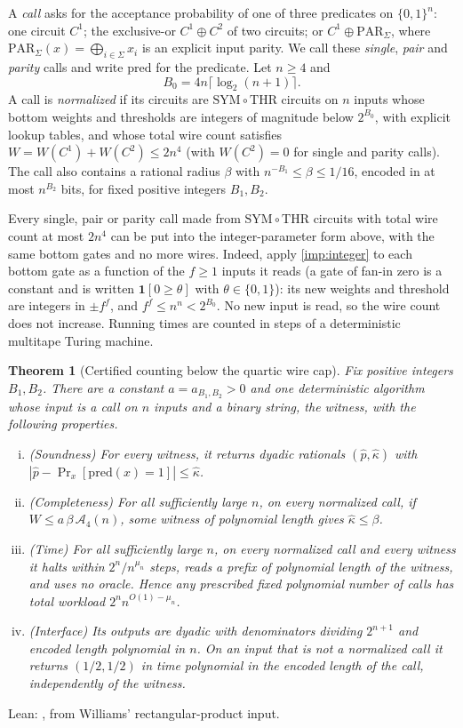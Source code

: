 \documentclass[11pt,letterpaper]{article}
\newtheorem{theorem}{Theorem}[section]
\theoremstyle{definition}
\theoremstyle{remark}
\newcommand{\THR}{\mathrm{THR}}
\newcommand{\SYM}{\mathrm{SYM}}
\newcommand{\PAR}{\mathrm{PAR}}
\newcommand{\pred}{\mathrm{pred}}
\newcommand{\ind}{\mathbf 1}
\newcommand{\lgx}{\log_2}
\newcommand{\phat}{\widehat p}
\newcommand{\khat}{\widehat\kappa}
\begin{document}
A \emph{call} asks for the acceptance
probability of one of three predicates on \(\{0,1\}^n\): one circuit
\(C^1\); the exclusive-or \(C^1\oplus C^2\) of two circuits; or
\(C^1\oplus\PAR_\Sigma\), where \(\PAR_\Sigma(x)=\bigoplus_{i\in\Sigma}x_i\)
is an explicit input parity. We call these \emph{single},
\emph{pair} and \emph{parity} calls and write \(\pred\) for the
predicate. Let \(n\ge4\) and
\[
 B_0=4n\lceil\lgx(n+1)\rceil .
\]
A call is \emph{normalized} if its circuits are \(\SYM\circ\THR\)
circuits on \(n\) inputs whose bottom weights and thresholds are
integers of magnitude below \(2^{B_0}\), with explicit lookup tables,
and whose total wire count satisfies \(W=W(C^1)+W(C^2)\le2n^4\)
(with \(W(C^2)=0\) for single and parity calls). The call also
contains a rational radius \(\beta\) with
\(n^{-B_1}\le\beta\le1/16\), encoded in at most \(n^{B_2}\) bits, for
fixed positive integers \(B_1,B_2\).

Every single, pair or parity call made from \(\SYM\circ\THR\) circuits with total wire count at most \(2n^4\) can be put into the integer-parameter form above, with the same bottom gates and no more wires. Indeed, apply \cref{imp:integer} to each
bottom gate as a function of the \(f\ge1\) inputs it reads (a gate of
fan-in zero is a constant and is written \(\ind[0\ge\theta]\) with
\(\theta\in\{0,1\}\)): its new weights and threshold are integers in
\(\pm f^f\), and \(f^f\le n^n<2^{B_0}\). No new input is read, so the
wire count does not increase. Running times are counted in steps of a deterministic multitape Turing machine.

\begin{theorem}[Certified counting below the quartic wire cap]
\label{thm:counter}
Fix positive integers \(B_1,B_2\). There are a constant
\(a=a_{B_1,B_2}>0\) and one deterministic algorithm whose input is a
call on \(n\) inputs and a binary string, the
\emph{witness}, with the following properties.
\begin{enumerate}[(i)]
\item (Soundness) For every witness, it returns dyadic rationals
\((\phat,\khat)\) with \(|\phat-\Pr_x[\pred(x)=1]|\le\khat\).
\item (Completeness) For all sufficiently large \(n\), on every normalized call, if
\(W\le a\,\beta\,\mathcal A_4(n)\), some witness of polynomial length
gives \(\khat\le\beta\).
\item (Time) For all sufficiently large \(n\), on every normalized
call and every witness it halts within \(2^n/n^{\mu_n}\) steps, reads
a prefix of polynomial length of the witness, and uses no oracle.
Hence any prescribed fixed polynomial number of calls has total
workload \(2^nn^{O(1)-\mu_n}\).
\item (Interface) Its outputs are dyadic with denominators dividing
\(2^{n+1}\) and encoded length polynomial in \(n\). On an input that is
not a normalized call it returns \((1/2,1/2)\) in time polynomial in
the encoded length of the call, independently of the witness.
\end{enumerate}
\end{theorem}
Lean: , from Williams' rectangular-product input.
\end{document}
